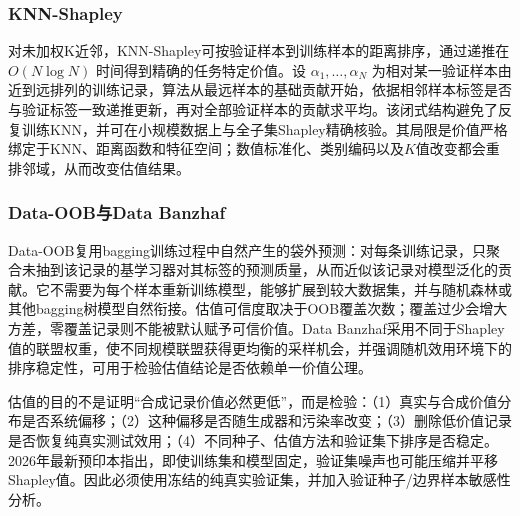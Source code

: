 \documentclass[
  chinese,
  12pt,
  a4paper,
  chinese,
  UTF8]{ctexart}
\begin{document}
\subsubsection{KNN-Shapley}\label{knn-shapley}

对未加权K近邻，KNN-Shapley可按验证样本到训练样本的距离排序，通过递推在
\(O(N\log N)\) 时间得到精确的任务特定价值\autocite{jia2019knn}。设
\(\alpha_1,\ldots,\alpha_N\)
为相对某一验证样本由近到远排列的训练记录，算法从最远样本的基础贡献开始，依据相邻样本标签是否与验证标签一致递推更新，再对全部验证样本的贡献求平均。该闭式结构避免了反复训练KNN，并可在小规模数据上与全子集Shapley精确核验。其局限是价值严格绑定于KNN、距离函数和特征空间；数值标准化、类别编码以及\(K\)值改变都会重排邻域，从而改变估值结果。

\subsubsection{Data-OOB与Data Banzhaf}\label{data-oobux4e0edata-banzhaf}

Data-OOB复用bagging训练过程中自然产生的袋外预测：对每条训练记录，只聚合未抽到该记录的基学习器对其标签的预测质量，从而近似该记录对模型泛化的贡献\autocite{kwon2023dataoob}。它不需要为每个样本重新训练模型，能够扩展到较大数据集，并与随机森林或其他bagging树模型自然衔接。估值可信度取决于OOB覆盖次数；覆盖过少会增大方差，零覆盖记录则不能被默认赋予可信价值。Data
Banzhaf采用不同于Shapley值的联盟权重，使不同规模联盟获得更均衡的采样机会，并强调随机效用环境下的排序稳定性\autocite{wang2023banzhaf}，可用于检验估值结论是否依赖单一价值公理。

估值的目的不是证明``合成记录价值必然更低''，而是检验：（1）真实与合成价值分布是否系统偏移；（2）这种偏移是否随生成器和污染率改变；（3）删除低价值记录是否恢复纯真实测试效用；（4）不同种子、估值方法和验证集下排序是否稳定。2026年最新预印本指出，即使训练集和模型固定，验证集噪声也可能压缩并平移Shapley值\autocite{shen2026validation}。因此必须使用冻结的纯真实验证集，并加入验证种子/边界样本敏感性分析。
\end{document}
